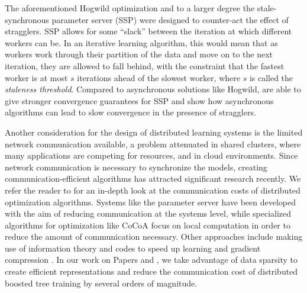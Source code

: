 The aforementioned Hogwild optimization \cite{hogwild} and to a larger degree the stale-synchronous
parameter server (SSP) \cite{stale-sync-ps} were designed to counter-act the effect of stragglers.
SSP allows for some ``slack'' between the iteration at which different workers can be. In an iterative learning algorithm, this would mean that as workers work through their partition of the data and move
on to the next iteration, they are allowed to fall behind, with the constraint that the fastest worker is at most
$s$ iterations ahead of the slowest worker, where $s$ is called the \emph{staleness threshold}.
Compared to asynchronous solutions like Hogwild, \citet{stale-sync-ps} are able to give stronger convergence
guarantees for SSP and show how asynchronous algorithms can lead to slow convergence in the presence of stragglers.

Another consideration for the design of distributed learning systems is the
limited network communication available, a problem attenuated in shared clusters,
where many applications are competing for resources, and in cloud environments.
Since network communication is necessary to synchronize the models, creating
communication-efficient algorithms has attracted significant research recently.
We refer the reader to \cite{optimization-communication-complexity} for an in-depth
look at the communication costs of distributed optimization algorithms.
Systems like the parameter server have been developed with the aim of reducing communication \cite{muPS}
at the systems level,
while specialized algorithms for optimization like CoCoA \cite{cocoa} focus on local computation
in order to reduce the amount of communication necessary. Other approaches include making use
of information theory and codes to speed up learning \cite{distributed-ml-codes} and gradient
compression \cite{gradient-compression}.
In our work on Papers \boostvhtNum and \blockgbtNum,
we take advantage of data sparsity to create efficient representations
and reduce the communication cost of distributed boosted tree training by several orders
of magnitude.
